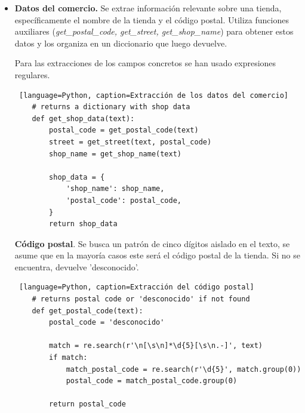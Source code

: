 \begin{itemize}
    \begin{lstlisting} [language=Python, caption=Extracción la fecha en un ticket]
    # returns date with dd/mm/aaaa format o 'desconocido' if not found
    def get_date(text):
        date = 'desconocido'
        text = text.replace(' ', '')

        date = get_date_dd_mm_yyyy(text)
        if date == 'desconocido':
            date = get_date_dd_mm_yy(text)   
            if date == 'desconocido':
                date = get_date_yyyy_mm_dd(text)

        return date
    \end{lstlisting}

    \item \textbf{Datos del comercio.} Se extrae información relevante sobre una tienda, específicamente el nombre de la tienda y el código postal. Utiliza funciones auxiliares (\textit{get\_postal\_code, get\_street, get\_shop\_name}) para obtener estos datos y los organiza en un diccionario que luego devuelve.
    
    Para las extracciones de los campos concretos se han usado expresiones regulares.  

    \begin{lstlisting} [language=Python, caption=Extracción de los datos del comercio]
    # returns a dictionary with shop data
    def get_shop_data(text):
        postal_code = get_postal_code(text)
        street = get_street(text, postal_code)
        shop_name = get_shop_name(text)

        shop_data = {
            'shop_name': shop_name,
            'postal_code': postal_code,
        }
        return shop_data
    \end{lstlisting}

\subitem \textbf{Código postal}. Se busca un patrón de cinco dígitos aislado en el texto, se asume que en la mayoría casos este será el código postal de la tienda. Si no se encuentra, devuelve 'desconocido'. \label{codigo_postal}
    \begin{lstlisting} [language=Python, caption=Extracción del código postal]
    # returns postal code or 'desconocido' if not found
    def get_postal_code(text):
        postal_code = 'desconocido'

        match = re.search(r'\n[\s\n]*\d{5}[\s\n.-]', text)
        if match:
            match_postal_code = re.search(r'\d{5}', match.group(0))
            postal_code = match_postal_code.group(0)

        return postal_code
    \end{lstlisting}



\end{itemize}
